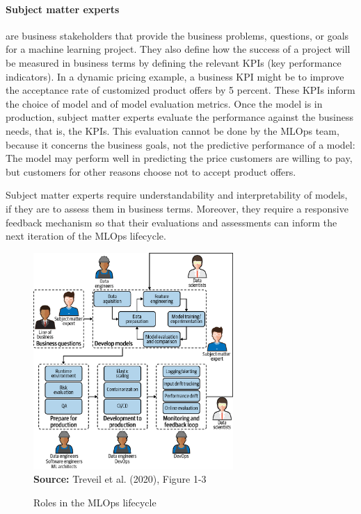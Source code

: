 \paragraph*{Subject matter experts} are business stakeholders that provide the business problems, questions, or goals for a machine learning project. They also define how the success of a project will be measured in business terms by defining the relevant KPIs (key performance indicators). In a dynamic pricing example, a business KPI might be to improve the acceptance rate of customized product offers by 5 percent. These KPIs inform the choice of model and of model evaluation metrics. Once the model is in production, subject matter experts evaluate the performance against the business needs, that is, the KPIs. This evaluation cannot be done by the MLOps team, because it concerns the business goals, not the predictive performance of a model: The model may perform well in predicting the price customers are willing to pay, but customers for other reasons choose not to accept product offers.

Subject matter experts require understandability and interpretability of models, if they are to assess them in business terms. Moreover, they require a responsive feedback mechanism so that their evaluations and assessments can inform the next iteration of the MLOps lifecycle.

\begin{figure}
\centering
\includegraphics[height=3.25in]{imlo_0103.png} \\

\scriptsize \textbf{Source:} Treveil et al. (2020), Figure 1-3
\caption{Roles in the MLOps lifecycle}
\label{fig:mlopsroles}
\end{figure}

